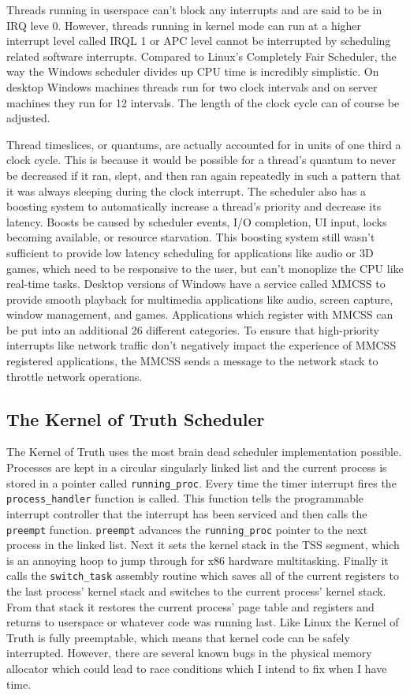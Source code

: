 \documentclass[10pt,conference,draftclsnofoot,onecolumn]{IEEEtran}
\begin{document}
Threads running in userspace can't block any interrupts and are said to be in IRQ leve 0. However, threads running in kernel mode can run at a higher interrupt level called IRQL 1 or APC level cannot be interrupted by scheduling related software interrupts. Compared to Linux's Completely Fair Scheduler, the way the Windows scheduler divides up CPU time is incredibly simplistic. On desktop Windows machines threads run for two clock intervals and on server machines they run for 12 intervals. The length of the clock cycle can of course be adjusted.

Thread timeslices, or quantums, are actually accounted for in units of one third a clock cycle. This is because it would be possible for a thread's quantum to never be decreased if it ran, slept, and then ran again repeatedly in such a pattern that it was always sleeping during the clock interrupt.
The scheduler also has a boosting system to automatically increase a thread's priority and decrease its latency. Boosts be caused by scheduler events, I/O completion, UI input, locks becoming available, or resource starvation. This boosting system still wasn't sufficient to provide low latency scheduling for applications like audio or 3D games, which need to be responsive to the user, but can't monoplize the CPU like real-time tasks. Desktop versions of Windows have a service called MMCSS to provide smooth playback for multimedia applications like audio, screen capture, window management, and games. Applications which register with MMCSS can be put into an additional 26 different categories. To ensure that high-priority interrupts like network traffic don't negatively impact the experience of MMCSS registered applications, the MMCSS sends a message to the network stack to throttle network operations\cite{2_russinovich_solomon_ionescu_2012}.

\subsection{The Kernel of Truth Scheduler}
The Kernel of Truth uses the most brain dead scheduler implementation possible. Processes are kept in a circular singularly linked list and the current process is stored in a pointer called \texttt{running\_proc}. Every time the timer interrupt fires the \texttt{process\_handler} function is called. This function tells the programmable interrupt controller that the interrupt has been serviced and then calls the \texttt{preempt} function. \texttt{preempt} advances the \texttt{running\_proc} pointer to the next process in the linked list. Next it sets the kernel stack in the TSS segment, which is an annoying hoop to jump through for x86 hardware multitasking. Finally it calls the \texttt{switch\_task} assembly routine which saves all of the current registers to the last process' kernel stack and switches to the current process' kernel stack. From that stack it restores the current process' page table and registers and returns to userspace or whatever code was running last. Like Linux the Kernel of Truth is fully preemptable, which means that kernel code can be safely interrupted. However, there are several known bugs in the physical memory allocator which could lead to race conditions which I intend to fix when I have time\cite{4_kronquist_2016}.
\end{document}
